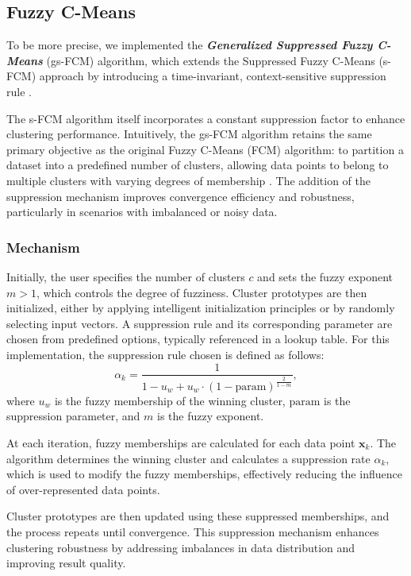 \subsection{Fuzzy C-Means}
\label{subsec:methods-fuzzy-cmeans}

To be more precise, we implemented the \textbf{\textit{Generalized Suppressed Fuzzy C-Means}} (gs-FCM) algorithm,
which extends the Suppressed Fuzzy C-Means (s-FCM) approach by introducing a time-invariant,
context-sensitive suppression rule \cite{suppresedFCM, gsFCM}. 
  
The s-FCM algorithm itself incorporates a constant suppression factor to enhance clustering
performance. Intuitively, the gs-FCM algorithm retains the same primary objective as the original 
Fuzzy C-Means (FCM) algorithm: to partition a dataset into a predefined number of clusters,
allowing data points to belong to multiple clusters with varying degrees of membership \cite{fcm}.
The addition of the suppression mechanism improves convergence efficiency and robustness,
particularly in scenarios with imbalanced or noisy data.

\subsubsection{Mechanism}

Initially, the user specifies the number of clusters \( c \) and sets the fuzzy exponent \( m > 1 \), which controls the degree of fuzziness. Cluster prototypes are then initialized, either by applying intelligent initialization principles or by randomly selecting input vectors. A suppression rule and its corresponding parameter are chosen from predefined options, typically referenced in a lookup table. For this implementation, the suppression rule chosen is defined as follows:
\[
\alpha_k = \frac{1}{1 - u_w + u_w \cdot \left(1 - \text{param}\right)^{\frac{2}{1-m}}},
\]
where \( u_w \) is the fuzzy membership of the winning cluster, \( \text{param} \) is the suppression parameter, and \( m \) is the fuzzy exponent.

At each iteration, fuzzy memberships are calculated for each data point \( \mathbf{x}_k \). The algorithm determines the winning cluster and calculates a suppression rate \( \alpha_k \), which is used to modify the fuzzy memberships, effectively reducing the influence of over-represented data points.

Cluster prototypes are then updated using these suppressed memberships, and the process repeats until convergence. This suppression mechanism enhances clustering robustness by addressing imbalances in data distribution and improving result quality.


